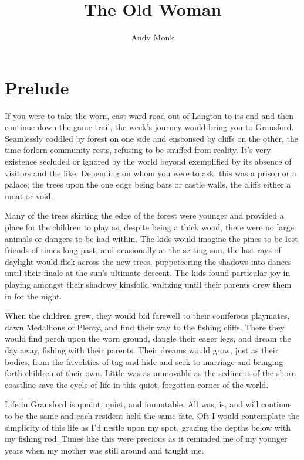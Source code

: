 \documentclass[11pt]{memoir}
\title{The Old Woman}
\author{Andy Monk}
\date{\vspace{-5ex}}
\begin{document}

\chapter*{Prelude}

If you were to take the worn, east-ward road out of Langton to its end and then continue down the game trail, the week's journey would bring you to Gransford. Seamlessly coddled by forest on one side and ensconsed by cliffs on the other, the time forlorn community rests, refusing to be snuffed from reality. It's very existence secluded or ignored by the world beyond exemplified by its absence of visitors and the like. Depending on whom you were to ask, this was a prison or a palace; the trees upon the one edge being bars or castle walls, the cliffs either a moat or void.

Many of the trees skirting the edge of the forest were younger and  provided a place for the children to play as, despite being a thick wood, there were no large animals or dangers to be had within. The kids would imagine the pines to be lost friends of times long past, and ocasionally at the setting sun, the last rays of daylight would flick across the new trees, puppeteering the shadows into dances until their finale at the sun's ultimate descent. The kids found particular joy in playing amongst their shadowy kinsfolk, waltzing until their parents drew them in for the night.

When the children grew, they would bid farewell to their coniferous playmates, dawn Medallions of Plenty, and find their way to the fishing cliffs. There they would find perch upon the worn ground, dangle their eager legs, and dream the day away, fishing with their parents. Their dreams would grow, just as their bodies, from the frivolities of tag and hide-and-seek to marriage and bringing forth children of their own. Little was as unmovable as the sediment of the shorn coastline save the cycle of life in this quiet, forgotten corner of the world.

Life in Gransford is quaint, quiet, and immutable. All was, is, and will continue to be the same and each resident held the same fate. Oft I would contemplate the simplicity of this life as I'd nestle upon my spot, grazing the depths below with my fishing rod. Times like this were precious as it reminded me of my younger years when my mother was still around and taught me.
\end{document}
